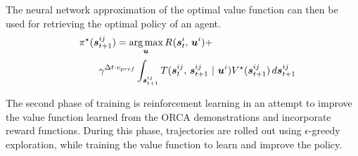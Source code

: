 \documentclass[conference]{IEEEtran}
\begin{document}
The neural network approximation of the optimal value function can then be used for retrieving the optimal policy of an agent.
\begin{alignat}{3}
    &&&\policy{}^{\star}(\state{ij}{t+1})=\argmax\limits_{\ctrl{}{}} \Reward{}(\state{i}{t}, \, \ctrl{i}{}) + \label{eqn:lookahead}\\
    &&&\qquad\gamma^{\dt \cdot \vel{pref}} \int_{\state{ij}{t+1}} \transition{\state{ij}{t}}{\state{ij}{t+1}}{\ctrl{i}{}} \Value(\state{ij}{t+1}) \, d\state{ij}{t+1}\nonumber
\end{alignat}

The second phase of training is reinforcement learning in an attempt to improve the value function learned from the ORCA demonstrations and incorporate reward functions. During this phase, trajectories are rolled out using $\epsilon$-greedy exploration, while training the value function to learn and improve the policy. 
\end{document}
